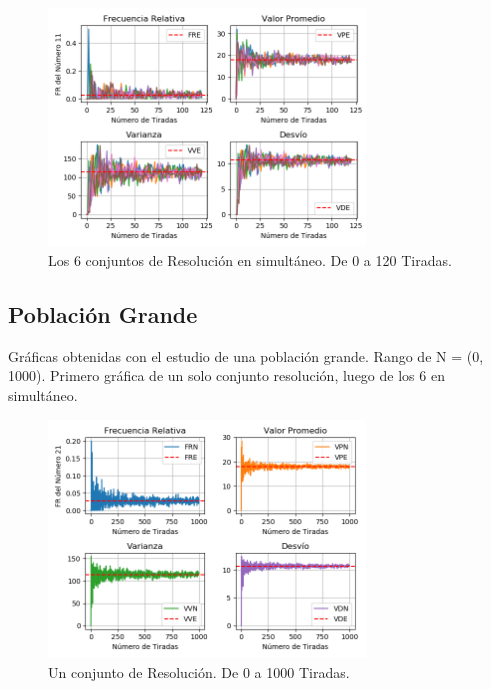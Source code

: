 \documentclass[a4paper]{article}
\begin{document}
\begin{figure}[H]
    \centering
    \includegraphics[width=0.75\textwidth]{./graphs/multi_graph_iterations_120.png}
    \caption{\label{fig:img4}Los 6 conjuntos de Resolución en simultáneo. De 0 a 120 Tiradas.}
\end{figure}

\subsection{Población Grande}
\label{sec:pobgra}

Gráficas obtenidas con el estudio de una población grande. Rango de N = (0, 1000). Primero gráfica de un solo conjunto resolución, luego de los 6 en simultáneo.

\begin{figure}[H]
    \centering
    \includegraphics[width=0.75\textwidth]{./graphs/graph_iterations_1000.png}
    \caption{\label{fig:img5}Un conjunto de Resolución. De 0 a 1000 Tiradas.}
\end{figure}
\end{document}
